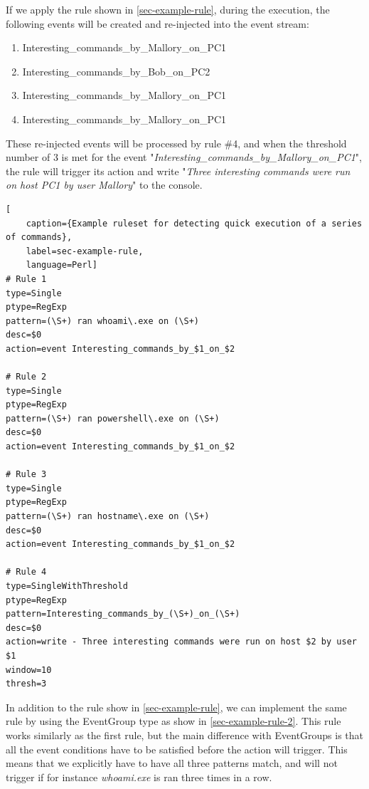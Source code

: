 If we apply the rule shown in \cref{sec-example-rule}, during the execution, the following events will be created and re-injected into the event stream:

\begin{enumerate}
    \item \colorbox{red!30}{Interesting\_commands\_by\_Mallory\_on\_PC1}
    \item \colorbox{green!30}{Interesting\_commands\_by\_Bob\_on\_PC2}
    \item \colorbox{red!30}{Interesting\_commands\_by\_Mallory\_on\_PC1}
    \item \colorbox{red!30}{Interesting\_commands\_by\_Mallory\_on\_PC1}
\end{enumerate}

These re-injected events will be processed by rule \#4, and when the threshold number of 3 is met for the event "\textit{Interesting\_commands\_by\_Mallory\_on\_PC1}", the rule will trigger its action and write "\textit{Three interesting commands were run on host PC1 by user Mallory}" to the console.

\begin{lstlisting}[
    caption={Example ruleset for detecting quick execution of a series of commands},
    label=sec-example-rule,
    language=Perl]
# Rule 1
type=Single
ptype=RegExp
pattern=(\S+) ran whoami\.exe on (\S+)
desc=$0
action=event Interesting_commands_by_$1_on_$2

# Rule 2
type=Single
ptype=RegExp
pattern=(\S+) ran powershell\.exe on (\S+)
desc=$0
action=event Interesting_commands_by_$1_on_$2

# Rule 3
type=Single
ptype=RegExp
pattern=(\S+) ran hostname\.exe on (\S+)
desc=$0
action=event Interesting_commands_by_$1_on_$2

# Rule 4
type=SingleWithThreshold
ptype=RegExp
pattern=Interesting_commands_by_(\S+)_on_(\S+)
desc=$0
action=write - Three interesting commands were run on host $2 by user $1
window=10
thresh=3
\end{lstlisting}

In addition to the rule show in \cref{sec-example-rule}, we can implement the same rule by using the EventGroup type as show in \cref{sec-example-rule-2}. This rule works similarly as the first rule, but the main difference with EventGroups is that all the event conditions have to be satisfied before the action will trigger. This means that we explicitly have to have all three patterns match, and will not trigger if for instance \textit{whoami.exe} is ran three times in a row.

